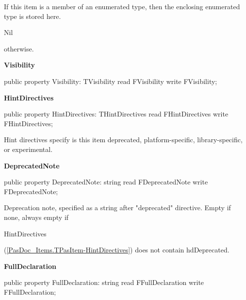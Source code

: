 \documentclass{report}
\newif\ifpdf
\begin{document}
\begin{list}{}
\begin{flushleft}
\ifpdf
\end{flushleft}
\fi


\par If this item is a member of an enumerated type, then the enclosing enumerated type is stored here. \begin{ttfamily}Nil\end{ttfamily} otherwise.\label{PasDoc_Items.TPasItem-Visibility}
\item[\textbf{Visibility}\hfill]
\ifpdf
\begin{flushleft}
\fi
\begin{ttfamily}
public property Visibility: TVisibility read FVisibility write FVisibility;\end{ttfamily}

\ifpdf
\end{flushleft}
\fi


\par  \label{PasDoc_Items.TPasItem-HintDirectives}
\item[\textbf{HintDirectives}\hfill]
\ifpdf
\begin{flushleft}
\fi
\begin{ttfamily}
public property HintDirectives: THintDirectives read FHintDirectives write FHintDirectives;\end{ttfamily}

\ifpdf
\end{flushleft}
\fi


\par Hint directives specify is this item deprecated, platform{-}specific, library{-}specific, or experimental.\label{PasDoc_Items.TPasItem-DeprecatedNote}
\item[\textbf{DeprecatedNote}\hfill]
\ifpdf
\begin{flushleft}
\fi
\begin{ttfamily}
public property DeprecatedNote: string
      read FDeprecatedNote write FDeprecatedNote;\end{ttfamily}

\ifpdf
\end{flushleft}
\fi


\par Deprecation note, specified as a string after "deprecated" directive. Empty if none, always empty if \begin{ttfamily}HintDirectives\end{ttfamily}(\ref{PasDoc_Items.TPasItem-HintDirectives}) does not contain hdDeprecated.\label{PasDoc_Items.TPasItem-FullDeclaration}
\item[\textbf{FullDeclaration}\hfill]
\ifpdf
\begin{flushleft}
\fi
\begin{ttfamily}
public property FullDeclaration: string read FFullDeclaration write FFullDeclaration;\end{ttfamily}


\end{flushleft}
\end{list}
\end{document}
